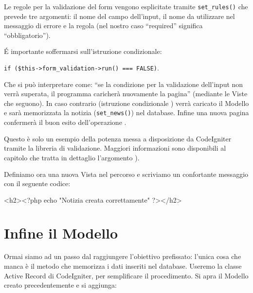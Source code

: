 Le regole per la validazione del form vengono esplicitate tramite \verb|set_rules()| che prevede tre argomenti: il nome del campo dell'input, il nome da utilizzare nel messaggio di errore e la regola (nel nostro caso ``required'' significa ``obbligatorio'').

\'E importante soffermarsi sull'istruzione condizionale: 

\verb|if ($this->form_validation->run() === FALSE)|. 

Che si può interpretare come: ``se la condizione per la validazione dell'input non verrà superata, il programma caricherà nuovamente la pagina'' (mediante le Viste che seguono). In caso contrario (istruzione condizionale ) verrà caricato il Modello e sarà memorizzata la notizia (\verb|set_news()|) nel database. Infine una nuova pagina confermerà il buon esito dell'operazione .

Questo è solo un esempio della potenza messa a disposizione da CodeIgniter tramite la libreria di validazione. Maggiori informazioni sono disponibili al capitolo che tratta in dettaglio l'argomento ).

Definiamo ora una nuova Vista  nel percorso  e scriviamo un confortante messaggio con il seguente codice:

\begin{code}
<h2><?php echo "Notizia creata correttamente" ?></h2>
\end{code}

\section*{Infine il Modello}
Ormai siamo ad un passo dal raggiungere l'obiettivo prefissato: l'unica cosa che manca è il metodo che memorizza i dati inseriti nel database. Useremo la classe Active Record di CodeIgniter, per semplificare il procedimento. Si apra il Modello creato precedentemente e si aggiunga:



